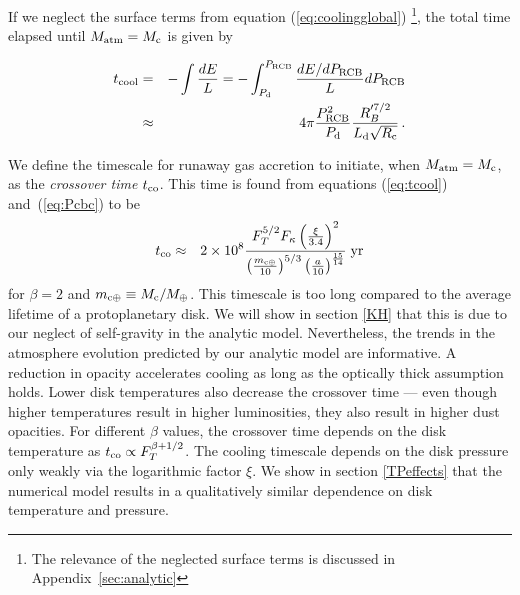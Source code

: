 \documentclass[apj]{emulateapj}
\newcommand{\yr}{\; {\rm yr}}
\newcommand{\Eqs}[2]{equations (\ref{#1}) and~(\ref{#2})}
\newcommand{\App}[1]{Appendix~\ref{#1}}
\newcommand{\co}{_{\rm c}}
\newcommand{\di}{_{\rm d}}
\newcommand{\cb}{_{\rm RCB}}
\newcommand{\mc}{m_{\rm c \oplus}}
\begin{document}
If we neglect the surface terms from equation (\ref{eq:coolingglobal}) \footnote{The relevance of the neglected surface terms is discussed in \App{sec:analytic}}, the total time elapsed until $M_{\rm{atm}}= M\co$ is given by

\begin{eqnarray} 
t_{\rm  cool} &=& -\int {d E \over L} = - \int_{P\di}^{P\cb } {d E/d P\cb \over L} dP\cb \\
&\approx& 4 \pi {P\cb^{2} \over P\di} {R_B'^{7/2} \over L\di \sqrt{R\co}} \label{eq:tcool}\, .
\end{eqnarray} 

We define the timescale for runaway gas accretion to initiate, when $M_{\rm{atm}}=M_{\rm c}$, as the \textit{crossover time} $t_{\rm{co}}$. This time is found from \Eqs{eq:tcool}{eq:Pcbc} to be
\begin{eqnarray} 
\label{eq:tcoolan}
t_{\rm co} &\approx & 2 \times 10^8 {F_T^{5/2}  F_\kappa \left(\xi \over 3.4\right)^2  \over \left(\mc \over 10 \right)^{5/3} \left(a\over 10\right)^{15 \over 14}} \yr
\end{eqnarray} 
for $\beta = 2$ and $\mc \equiv M_{\rm c} / M_{\oplus}$.  
This timescale is too long compared to the average lifetime of a protoplanetary disk. We will show in section \ref{KH} that this is due to our neglect of self-gravity in the analytic model.  Nevertheless, the trends in the atmosphere evolution predicted by our analytic model are informative.  A reduction in opacity accelerates cooling as long as the optically thick assumption holds.  Lower disk temperatures also decrease the crossover time --- even though higher temperatures result in higher luminosities, they also result in higher dust opacities.   For different $\beta$ values, the crossover time depends on the disk temperature as $t_{\rm co} \propto F_T^{ \beta + 1/2}$.  The cooling timescale depends on the disk pressure only weakly via the  logarithmic factor $\xi$.  We show in section \ref{TPeffects} that the numerical model results in a qualitatively similar dependence on disk temperature and pressure.  %
\end{document}
